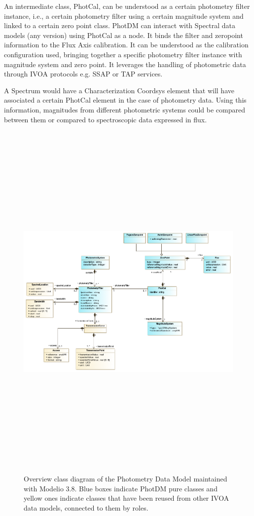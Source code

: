 \documentclass[11pt,a4paper]{ivoa}
\begin{document}
An intermediate class, PhotCal, can be understood as a certain photometry
filter instance, i.e., a certain photometry filter using a certain magnitude
system and linked to a certain zero point class.
PhotDM can interact with Spectral data models (any version) using PhotCal
as a node. It binds the filter and
zeropoint information to the Flux Axis calibration. It can be understood as the
calibration configuration used, bringing together a specific photometry filter
instance with magnitude system and zero point. It leverages the handling of
photometric data through IVOA protocols e.g. SSAP or TAP services.
\par

A Spectrum would have a Characterization Coordsys element that will have
associated a certain PhotCal element in the case of photometry data. Using
this information, magnitudes from different photometric systems could be
compared between them or compared to spectroscopic data expressed in flux.
\par

\begin{figure}[H]
\includegraphics[angle=90,width=5.98in,height=7.19in]{./schema/PhotometryOverviewDiagram_20220520.png}
\caption{Overview class diagram of the Photometry Data Model maintained with Modelio 3.8.
Blue boxes indicate PhotDM pure classes and yellow ones indicate classes that have been reused from other
IVOA data models, connected to them by roles.}
\label{fig:overview}
\end{figure}
\end{document}
